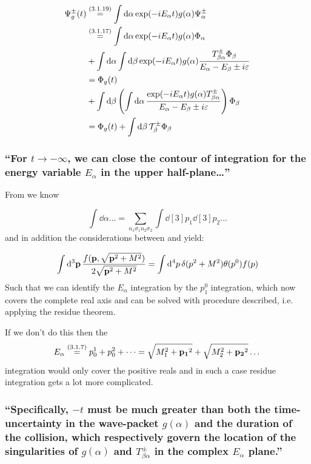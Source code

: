 \subsubsection{ }
\label{sususec:3_1_p112_1}
\begin{align*}
	\Psi^\pm_g(t)&\overset{({3.1.19})}{=}\int \dd{\alpha} \exp(-iE_\alpha t) g(\alpha)\Psi_\alpha^\pm\\
	&\overset{({3.1.17})}{=}\int \dd{\alpha} \exp(-iE_\alpha t) g(\alpha) \Phi_\alpha\\
	&+\int \dd{\alpha} \int \dd{\beta}\exp(-iE_\alpha t) g(\alpha)\dfrac{T_{\beta\alpha}^\pm \Phi_\beta}{E_\alpha-E_\beta\pm i \varepsilon}\\
	&=\Phi_g(t)\\
	&+\int \dd{\beta}\left(\int \dd{\alpha} \dfrac{\exp(-iE_\alpha t) g(\alpha)T_{\beta\alpha}^\pm }{E_\alpha-E_\beta\pm i \varepsilon}\right)\Phi_\beta\\
	&=\Phi_g(t)+\int \dd{\beta} \mathcal{T}^\pm_\beta \Phi_\beta
\end{align*}


\subsubsection{\enquote{For $t\rightarrow-\infty$, we can close the contour of integration for the energy variable $E_\alpha$ in the upper half-plane\dots} }

From  we know

\[\int \dd{\alpha} \dots = \sum\limits_{n_1 \sigma_1 n_2 \sigma_2}\int\dd[3]{p_1}\dd[3]{p_2} \dots\]
and in addition the considerations between  and  yield:

\[\int \dd[3]{\ensuremath{\mathbf{p}}} \dfrac{f(\mathbf{p},\sqrt{\mathbf{p}^2+M^2})}{2\sqrt{\mathbf{p}^2+M^2}}=\int \dd[4]{p} \delta(p^2+M^2) \theta(p^0) f(p)\]
Such that we can identify the $E_\alpha$ integration by the $p_1^0$ integration, which now covers the complete real axis and can be solved with procedure described, i.e. applying the residue theorem.

If we don't do this then the
\[E_\alpha \overset{({3.1.7})}{=}p_0^1+p_0^2+\dots=\sqrt{M_1^2+\mathbf{p_1}^2}+\sqrt{M_2^2+\mathbf{p_2}^2}\dots\]
integration would only cover the positive reals and in such a case residue integration gets a lot more complicated.


\subsubsection{\enquote{Specifically, $-t$ must be much greater than both the time-uncertainty in the wave-packet $g(\alpha)$ and the duration of the collision, which respectively govern the location of the singularities of $g(\alpha)$ and $T_{\beta\alpha}^\pm$ in the complex $E_\alpha$ plane.} }

